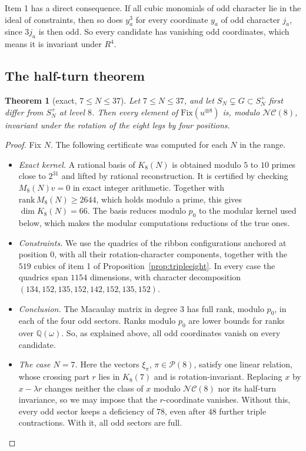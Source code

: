 \documentclass[11pt]{amsart}
\newtheorem{theorem}{Theorem}[section]
\theoremstyle{definition}
\theoremstyle{remark}
\theoremstyle{plain}
\numberwithin{equation}{section}
\numberwithin{table}{section}
\newcommand{\Q}{\mathbb Q}
\newcommand{\Fix}{\mathrm{Fix}}
\newcommand{\NC}{\mathcal{NC}}
\newcommand{\Pp}{\mathcal{P}}
\begin{document}
Item 1 has a direct consequence. If all cubic monomials of odd character lie in the ideal of constraints, then so does $y_a^3$ for every coordinate $y_a$ of odd character $j_a$, since $3j_a$ is then odd. So every candidate has vanishing odd coordinates, which means it is invariant under $R^4$.

\subsection{The half-turn theorem}

\begin{theorem}[exact, $7\le N\le37$]\label{thm:halfturn}
Let $7\le N\le37$, and let $S_N\subsetneq G\subset S_N^+$ first differ from $S_N^+$ at level $8$. Then every element of $\Fix(u^{\otimes8})$ is, modulo $\NC(8)$, invariant under the rotation of the eight legs by four positions.
\end{theorem}

\begin{proof}
Fix $N$. The following certificate was computed for each $N$ in the range.
\begin{itemize}
\item \emph{Exact kernel.} A rational basis of $K_8(N)$ is obtained modulo $5$ to $10$ primes close to $2^{31}$ and lifted by rational reconstruction. It is certified by checking $M_8(N)v=0$ in exact integer arithmetic. Together with $\mathrm{rank}\,M_8(N)\ge2644$, which holds modulo a prime, this gives $\dim K_8(N)=66$. The basis reduces modulo $p_0$ to the modular kernel used below, which makes the modular computations reductions of the true ones.
\item \emph{Constraints.} We use the quadrics of the ribbon configurations anchored at position $0$, with all their rotation-character components, together with the $519$ cubics of item 1 of Proposition~\ref{prop:tripleeight}. In every case the quadrics span $1154$ dimensions, with character decomposition $(134,152,135,152,142,152,135,152)$.
\item \emph{Conclusion.} The Macaulay matrix in degree $3$ has full rank, modulo $p_0$, in each of the four odd sectors. Ranks modulo $p_0$ are lower bounds for ranks over $\Q(\omega)$. So, as explained above, all odd coordinates vanish on every candidate.
\item \emph{The case $N=7$.} Here the vectors $\xi_\pi$, $\pi\in\Pp(8)$, satisfy one linear relation, whose crossing part $r$ lies in $K_8(7)$ and is rotation-invariant. Replacing $x$ by $x-\lambda r$ changes neither the class of $x$ modulo $\NC(8)$ nor its half-turn invariance, so we may impose that the $r$-coordinate vanishes. Without this, every odd sector keeps a deficiency of $78$, even after $48$ further triple contractions. With it, all odd sectors are full. \qedhere
\end{itemize}
\end{proof}
\end{document}

